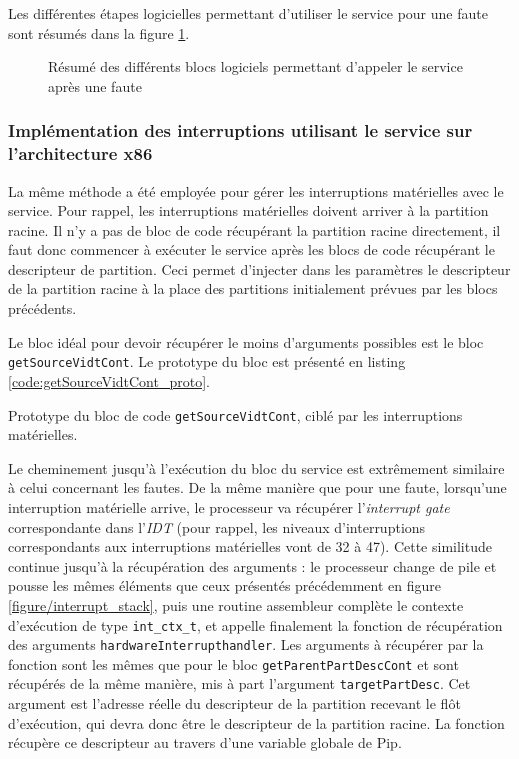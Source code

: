		Les différentes étapes logicielles permettant d'utiliser le service pour une faute sont résumés dans la figure \ref{fig:fault_software}.

		\begin{figure}[!ht]
			\centering
			
			\caption{Résumé des différents blocs logiciels permettant d'appeler le service après une faute}
			\label{fig:fault_software}
		\end{figure}

		\subsubsection{Implémentation des interruptions utilisant le service sur l'architecture x86}

		La même méthode a été employée pour gérer les interruptions matérielles avec le service. Pour rappel, les interruptions matérielles doivent arriver à la partition racine. Il n'y a pas de bloc de code récupérant la partition racine directement, il faut donc commencer à exécuter le service après les blocs de code récupérant le descripteur de partition. Ceci permet d'injecter dans les paramètres le descripteur de la partition racine à la place des partitions initialement prévues par les blocs précédents.

		Le bloc idéal pour devoir récupérer le moins d'arguments possibles est le bloc \texttt{getSourceVidtCont}. Le prototype du bloc est présenté en listing \ref{code:getSourceVidtCont_proto}.

		\begin{listing}[!ht]
			\caption{Prototype du bloc de code \texttt{getSourceVidtCont}, ciblé par les interruptions matérielles.}
			\label{code:getSourceVidtCont_proto}
		\end{listing}

		Le cheminement jusqu'à l'exécution du bloc du service est extrêmement similaire à celui concernant les fautes. De la même manière que pour une faute, lorsqu'une interruption matérielle arrive, le processeur va récupérer l'\emph{interrupt gate} correspondante dans l'\emph{IDT} (pour rappel, les niveaux d'interruptions correspondants aux interruptions matérielles vont de 32 à 47). Cette similitude continue jusqu'à la récupération des arguments : le processeur change de pile et pousse les mêmes éléments que ceux présentés précédemment en figure \ref{figure/interrupt_stack}, puis une routine assembleur complète le contexte d'exécution de type \texttt{int\_ctx\_t}, et appelle finalement la fonction de récupération des arguments \texttt{hardwareInterrupthandler}. Les arguments à récupérer par la fonction sont les mêmes que pour le bloc \texttt{getParentPartDescCont} et sont récupérés de la même manière, mis à part l'argument \texttt{targetPartDesc}. Cet argument est l'adresse réelle du descripteur de la partition recevant le flôt d'exécution, qui devra donc être le descripteur de la partition racine. La fonction récupère ce descripteur au travers d'une variable globale de Pip.

